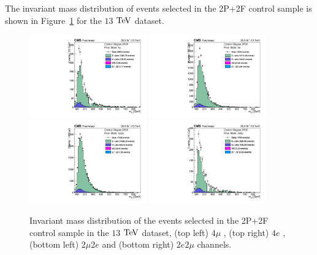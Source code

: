 The invariant mass distribution of events selected in the 2P+2F control sample
is shown in Figure~\ref{fig:2P2F_dataMC} for the $13$ $\mathrm{Te\kern -0.1em V}$ dataset. 

\begin{figure}[!htb]
\begin{center}
    {\includegraphics [width=0.45\textwidth] {Figures/RedBkg/HZZ_2P2Fuw_ZZMass_4m.pdf}}
    {\includegraphics [width=0.45\textwidth] {Figures/RedBkg/HZZ_2P2Fuw_ZZMass_4e.pdf}} \\
    {\includegraphics [width=0.45\textwidth] {Figures/RedBkg/HZZ_2P2Fuw_ZZMass_2m2e.pdf}}
    {\includegraphics [width=0.45\textwidth] {Figures/RedBkg/HZZ_2P2Fuw_ZZMass_2e2m.pdf}} \\
\caption{
Invariant mass distribution of the events selected in the 2P+2F control sample in the
$13$ $\mathrm{Te\kern -0.1em V}$ dataset, (top left)  $4\mu$ , (top right) $4e$ , (bottom left)  $2\mu2e$ and (bottom right)  $2e2\mu$ channels.
}
\label{fig:2P2F_dataMC}
\end{center}
\end{figure}


